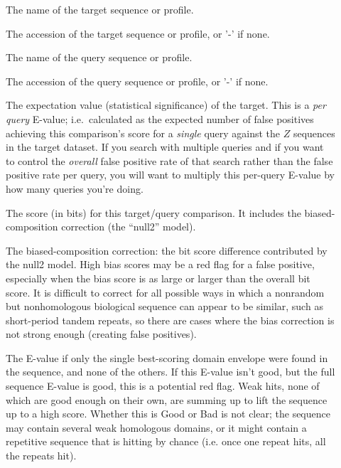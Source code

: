 \begin{description}
\item[]
  The name of the target sequence or profile. 

\item[]
  The accession of the target sequence or profile, or '-' if none.

\item[] 
  The name of the query sequence or profile.

\item[]
  The accession of the query sequence or profile, or '-' if none.

\item[] The expectation value
  (statistical significance) of the target.  This is a \emph{per
  query} E-value; i.e.\ calculated as the expected number of false
  positives achieving this comparison's score for a \emph{single}
  query against the $Z$ sequences in the target dataset.  If you
  search with multiple queries and if you want to control the
  \emph{overall} false positive rate of that search rather than the
  false positive rate per query, you will want to multiply this
  per-query E-value by how many queries you're doing.

\item[] 
  The score (in bits) for this target/query comparison. It includes
  the biased-composition correction (the ``null2'' model). 

\item[] The biased-composition
  correction: the bit score difference contributed by the null2
  model. High bias scores may be a red flag for a false positive,
  especially when the bias score is as large or larger than the
  overall bit score. It is difficult to correct for all possible ways
  in which a nonrandom but nonhomologous biological sequence can
  appear to be similar, such as short-period tandem repeats, so there
  are cases where the bias correction is not strong enough (creating
  false positives).

\item[] The E-value if only the
  single best-scoring domain envelope were found in the sequence, and
  none of the others. If this E-value isn't good, but the full
  sequence E-value is good, this is a potential red flag.  Weak hits,
  none of which are good enough on their own, are summing up to lift
  the sequence up to a high score. Whether this is Good or Bad is not
  clear; the sequence may contain several weak homologous domains, or
  it might contain a repetitive sequence that is hitting by chance
  (i.e. once one repeat hits, all the repeats hit).


\end{description}
